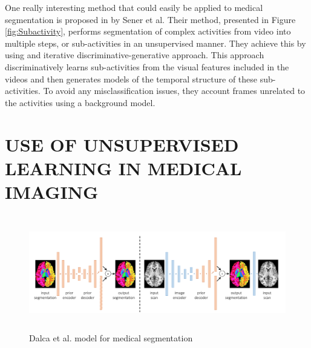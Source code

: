 \documentclass[letterpaper, 10 pt, conference]{ieeeconf}  %
\begin{document}
One really interesting method that could easily be applied to medical segmentation is proposed in \cite{Sener_2018_CVPR} by Sener et al. Their method, presented in Figure \ref{fig:Subactivity}, performs segmentation of complex activities from video into multiple steps, or sub-activities in an unsupervised manner. They achieve this by using and iterative discriminative-generative approach. This approach discriminatively learns sub-activities from the visual features included in the videos and then generates models of the temporal structure of these sub-activities. To avoid any misclassification issues, they account frames unrelated to the activities using a background model. 

\section{USE OF UNSUPERVISED LEARNING IN MEDICAL IMAGING}

\begin{figure}[h!]
\includegraphics[width=\textwidth,height=5cm]{dalca.png}
\caption{Dalca et al. model for medical segmentation}
\label{fig:dalca}
\end{figure}
\end{document}
